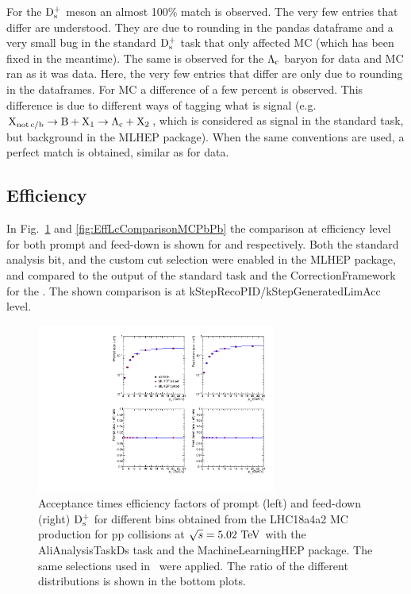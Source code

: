 For the $\rm D_s^+$ meson an almost 100\% match is observed. The very few entries that differ are understood. They are due to rounding in the pandas dataframe and a very small bug in the standard $\rm D_s^+$ task that only affected MC (which has been fixed in the meantime). The same is observed for the $\mbox{$\mathrm {\Lambda_{c}}$}$ baryon for data and MC ran as it was data. Here, the very few entries that differ are only due to rounding in the dataframes. For MC a difference of a few percent is observed. This difference is due to different ways of tagging what is signal (e.g. ${\rm X}_{\rm not \, c/b} \rightarrow {\rm B} + {\rm X}_{1} \rightarrow \mbox{$\mathrm {\Lambda_{c}}$} + {\rm X}_{2}$, which is considered as signal in the standard task, but background in the MLHEP package). When the same conventions are used, a perfect match is obtained, similar as for data.

\subsection{Efficiency}
\label{subsec:effValidation}

In Fig.~\ref{fig:EffDsComparisonMCpp} and \ref{fig:EffLcComparisonMCPbPb} the comparison at efficiency level for both prompt and feed-down is shown for \Ds and \Lc respectively. Both the standard analysis bit, and the custom cut selection were enabled in the MLHEP package, and compared to the output of the standard \Ds task and the CorrectionFramework for the \Lc. The shown comparison is at kStepRecoPID/kStepGeneratedLimAcc level.

\begin{figure}[tb]
\begin{center}
\includegraphics[width=0.7\textwidth]{figures/DsEfficiencyComparison.pdf}
\caption{Acceptance times efficiency factors of prompt (left) and feed-down (right) $\rm D_s^+$ for different \pt bins obtained from the LHC18a4a2 MC production for pp collisions at $\sqrt{s}=5.02~\mathrm{TeV}$ with the AliAnalysisTaskDs task and the MachineLearningHEP package. The same selections used in~\cite{Acharya:2019mgn} were applied. The ratio of the different distributions is shown in the bottom plots.}
\label{fig:EffDsComparisonMCpp} 
\end{center}
\end{figure}

